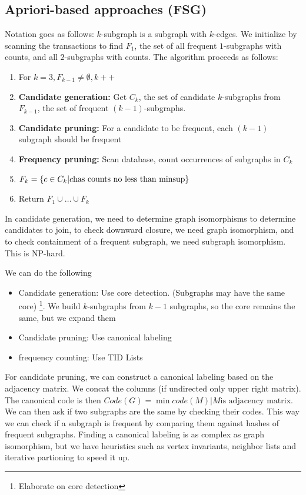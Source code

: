  \subsection{Apriori-based approaches (FSG)}
    Notation goes as follows: $k$-subgraph is a subgraph with $k$-edges. We initialize by scanning the transactions to find $F_1$, the set of all frequent $1$-subgraphs with counts, and all $2$-subgraphs with counts. The algorithm proceeds as follows:
    \begin{enumerate}
        \item For $k=3, F_{k-1} \neq \emptyset, k++$
        \item \textbf{Candidate generation:} Get $C_k$, the set of candidate $k$-subgraphs from $F_{k-1}$, the set of frequent $(k-1)$-subgraphs. 
        \item \textbf{Candidate pruning:} For a candidate to be frequent, each $(k-1)$ subgraph should be frequent
        \item \textbf{Frequency pruning:} Scan database, count occurrences of subgraphs in $C_k$
        \item $F_k = \{c \in C_k | c  \text{has counts no less than minsup}\}$ 
        \item Return $F_1 \cup \dots \cup F_k$
    \end{enumerate}
    In candidate generation, we need to determine graph isomorphisms to determine candidates to join, to check downward closure, we need graph isomorphism, and to check containment of a frequent subgraph, we need subgraph isomorphism. This is NP-hard. 
    
    We can do the following
    \begin{itemize}
        \item Candidate generation: Use core detection. (Subgraphs may have the same core) \footnote{Elaborate on core detection}. We build $k$-subgraphs from $k-1$ subgraphs, so the core remains the same, but we expand them
        \item Candidate pruning: Use canonical labeling 
        \item frequency counting: Use TID Lists
    \end{itemize}
    
    For candidate pruning, we can construct a canonical labeling based on the adjacency matrix. We concat the columns (if undirected only upper right matrix). The canonical code is then $Code(G) = \min{code(M) | M \text{is adjacency matrix}}$. We can then ask if two subgraphs are the same by checking their codes. This way we can check if a subgraph is frequent by comparing them against hashes of frequent subgraphs. Finding a canonical labeling is as complex as graph isomorphism, but we have heuristics such as vertex invariants, neighbor lists and iterative partioning to speed it up. 

